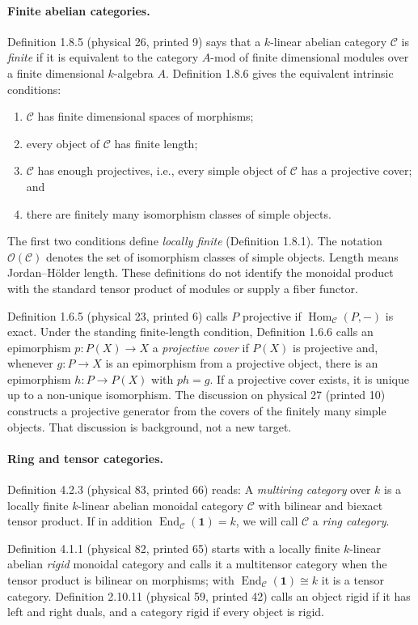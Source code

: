 \documentclass[11pt]{article}
\DeclareMathOperator{\Hom}{Hom}
\DeclareMathOperator{\End}{End}
\newcommand{\Cat}{\mathcal C}
\newcommand{\unit}{\mathbf 1}
\newcommand{\Obj}{\mathcal O}
\begin{document}
\paragraph{Finite abelian categories.}
Definition 1.8.5 (physical 26, printed 9) says that a $k$-linear abelian
category $\Cat$ is \emph{finite} if it is equivalent to the category
$A\text{-mod}$ of finite dimensional modules over a finite dimensional
$k$-algebra $A$. Definition 1.8.6 gives the equivalent intrinsic conditions:
\begin{enumerate}
\item $\Cat$ has finite dimensional spaces of morphisms;
\item every object of $\Cat$ has finite length;
\item $\Cat$ has enough projectives, i.e., every simple object of $\Cat$
has a projective cover; and
\item there are finitely many isomorphism classes of simple objects.
\end{enumerate}
The first two conditions define \emph{locally finite} (Definition 1.8.1).
The notation $\Obj(\Cat)$ denotes the set of isomorphism classes of
simple objects. Length means Jordan--H\"older length. These definitions
do not identify the monoidal product with the standard tensor product
of modules or supply a fiber functor.

Definition 1.6.5 (physical 23, printed 6) calls $P$ projective if
$\Hom_{\Cat}(P,-)$ is exact. Under the standing finite-length condition,
Definition 1.6.6 calls an epimorphism $p:P(X)\to X$ a \emph{projective
cover} if $P(X)$ is projective and, whenever $g:P\to X$ is an
epimorphism from a projective object, there is an epimorphism
$h:P\to P(X)$ with $ph=g$. If a projective cover exists, it is unique
up to a non-unique isomorphism. The discussion on physical 27 (printed
10) constructs a projective generator from the covers of the finitely
many simple objects. That discussion is background, not a new target.

\paragraph{Ring and tensor categories.}
Definition 4.2.3 (physical 83, printed 66) reads:
A \emph{multiring category} over $k$ is a locally finite $k$-linear
abelian monoidal category $\Cat$ with bilinear and biexact tensor product.
If in addition $\End_{\Cat}(\unit)=k$, we will call $\Cat$ a
\emph{ring category}.

Definition 4.1.1 (physical 82, printed 65) starts with a locally finite
$k$-linear abelian \emph{rigid} monoidal category and calls it a
multitensor category when the tensor product is bilinear on morphisms;
with $\End_{\Cat}(\unit)\cong k$ it is a tensor category.
Definition 2.10.11 (physical 59, printed 42) calls an object rigid if it
has left and right duals, and a category rigid if every object is rigid.
\end{document}

